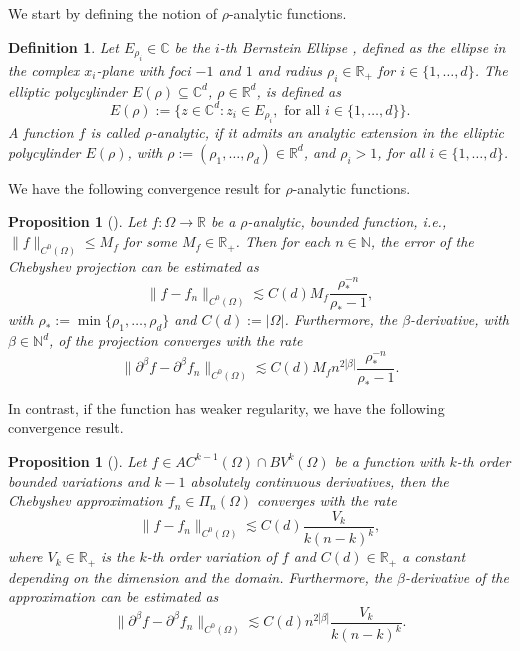 \documentclass[pdflatex]{sn-jnl}%
\newtheorem{proposition}[theorem]{Proposition}%
\newtheorem{definition}[theorem]{Definition}
\begin{document}
We start by defining the notion of $\rho$-analytic functions. 
\begin{definition}\label{assm:Berns_ell}
    Let $E_{\rho_i} \in \mathbb{C}$ be the $i$-th \emph{Bernstein Ellipse} \cite{Trefethen2017_mD}, defined as the ellipse in the complex  $x_i$-plane with foci $-1$ and $1$ and radius $\rho_i \in \mathbb{R}_+$ for $i\in \{1,\dots, d\}$. The \emph{elliptic polycylinder} $E(\rho)\subseteq \mathbb{C}^{d}$, $\rho\in\mathbb{R}^{d}$, is defined as 
    $$
    E(\rho):=\{z\in \mathbb{C}^{d}: z_i \in E_{\rho_i},\textrm{ for all }i\in \{1,\dots,d\}\}.
    $$
   A function $f$ is called $\rho$-analytic, if it admits an analytic extension in the \emph{elliptic polycylinder} $E(\rho)$,  with $\rho:=(\rho_1,\dots, \rho_{d})\in \mathbb{R}^{d}$, and $\rho_i>1$, for all $i\in \{1,\dots,d\}$.
\end{definition}
We have the following convergence result for $\rho$-analytic functions.
\begin{proposition}[\cite{Suarez2025}]\label{prop:conv_an}
    Let $f:\Omega\rightarrow \mathbb{R}$ be a $\rho$-analytic, bounded function, i.e., $\|f\|_{C^0(\Omega)}\leq M_f$ for some $M_f\in \mathbb{R}_+$. Then for each $n\in \mathbb{N} $, the error of the Chebyshev projection can be estimated as
    \begin{equation}
    \|f-f_n\|_{C^0(\Omega)}\lesssim C(d)M_f\frac{\rho^{-n}_*}{\rho_*-1},
    \end{equation}
    with $
    \rho_*:=\min\limits \{\rho_1,\dots,\rho_{d}\}$ and $C(d):=|\Omega|$.
    Furthermore, the $\beta$-derivative, with $\beta\in \mathbb{N}^d$, of the projection converges with the rate 
    \begin{equation}        
    \|\partial^\beta f-\partial^\beta f_n\|_{C^0(\Omega)}\lesssim  C(d)M_fn^{2|\beta|}\frac{\rho^{-n}_*}{\rho_*-1}.
    \end{equation}
\end{proposition}
In contrast, if the function has weaker regularity, we have the following convergence result.
\begin{proposition}[\cite{zavalani2024}]\label{prop:abs_cont}
    Let $f\in AC^{k-1}(\Omega)\cap BV^k(\Omega)$ be a function with $k$-th order bounded variations and $k-1$ absolutely continuous derivatives, then the Chebyshev approximation $f_n\in \Pi_{n}(\Omega)$ converges with the rate
    \begin{equation}
        \|f-f_n\|_{C^0(\Omega)}\lesssim C(d) \frac{V_k}{k(n-k)^{k}},
    \end{equation}
    where $V_k\in \mathbb{R}_{+}$ is the $k$-th order variation of $f$ and $C(d)\in \mathbb{R}_+$ a constant depending on the dimension and the domain. Furthermore, the $\beta$-derivative of the approximation can be estimated as
    \begin{equation}
        \|\partial^\beta f-\partial^\beta f_n\|_{C^0(\Omega)}\lesssim C(d) n^{2|\beta|}\frac{V_k}{k(n-k)^{k}}.
    \end{equation}
\end{proposition}
\end{document}

